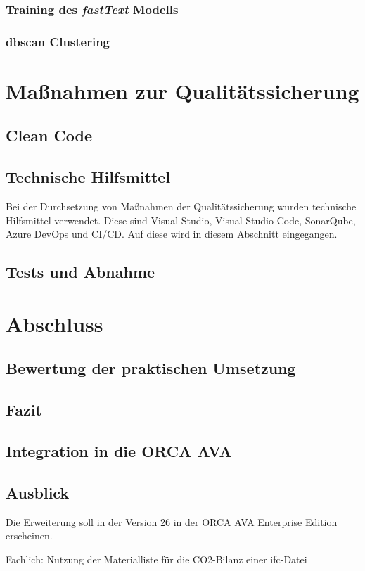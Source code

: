 \subsection{Training des \textit{fastText} Modells}
\label{c:implementation:embedding-training}
\subsection{\ac{dbscan} Clustering}
\label{c:implementation:clustering}





\chapter{Maßnahmen zur Qualitätssicherung}
\label{c:qs}
\section{Clean Code}
\label{c:qs:cleancode}
\section{Technische Hilfsmittel}
\label{c:qs:technical_aids}
Bei der Durchsetzung von Maßnahmen der Qualitätssicherung wurden technische Hilfsmittel verwendet. Diese sind Visual Studio, Visual Studio Code, SonarQube, Azure DevOps und CI/CD. Auf diese wird in diesem Abschnitt eingegangen.
\section{Tests und Abnahme}
\label{c:qs:tests}


\chapter{Abschluss}
\label{c:closing}

\section{Bewertung der praktischen Umsetzung}
\label{c:closing:rating}
\section{Fazit}
\label{c:closing:conclusion}
\section{Integration in die ORCA AVA}
\label{c:closing:integration}
\section{Ausblick}
\label{c:closing:outlook}
Die Erweiterung soll in der Version 26 in der ORCA AVA Enterprise Edition erscheinen.

Fachlich: Nutzung der Materialliste für die CO2-Bilanz einer \ac{ifc}-Datei
